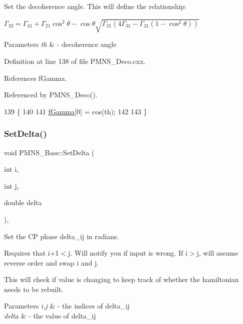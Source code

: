 Set the decoherence angle. This will define the relationship\+:

$ \Gamma_{32} = \Gamma_{31} + \Gamma_{21} \cos^2\theta - \cos\theta \sqrt{\Gamma_{21} (4\Gamma_{31} - \Gamma_{21} (1 - \cos^2\theta))} $


\begin{DoxyParams}{Parameters}
{\em th} & -\/ decoherence angle \\
\hline
\end{DoxyParams}


Definition at line 138 of file P\+M\+N\+S\+\_\+\+Deco.\+cxx.



References f\+Gamma.



Referenced by P\+M\+N\+S\+\_\+\+Deco().


\begin{DoxyCode}
139 \{
140 
141   \hyperlink{classOscProb_1_1PMNS__Deco_ae2f30ac9f8b25344959f1698616d337a}{fGamma}[0] = cos(th);
142   
143 \}
\end{DoxyCode}
\mbox{\label{classOscProb_1_1PMNS__Base_a4bef78cfcfc4e70b4ce79cdb8862c0a3}} 
\subsubsection{\texorpdfstring{Set\+Delta()}{SetDelta()}}
{\footnotesize\ttfamily void P\+M\+N\+S\+\_\+\+Base\+::\+Set\+Delta (\begin{DoxyParamCaption}\item[{int}]{i,  }\item[{int}]{j,  }\item[{double}]{delta }\end{DoxyParamCaption})\hspace{0.3cm}{\ttfamily [virtual]}, {\ttfamily [inherited]}}

Set the CP phase delta\+\_\+ij in radians.

Requires that i+1$<$j. Will notify you if input is wrong. If i$>$j, will assume reverse order and swap i and j.

This will check if value is changing to keep track of whether the hamiltonian needs to be rebuilt.


\begin{DoxyParams}{Parameters}
{\em i,j} & -\/ the indices of delta\+\_\+ij \\
\hline
{\em delta} & -\/ the value of delta\+\_\+ij \\
\hline
\end{DoxyParams}


